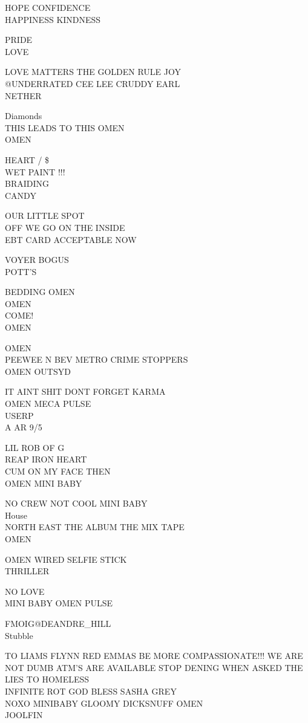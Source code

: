 \documentclass[10pt,letterpaper]{article}
\begin{document}
HOPE CONFIDENCE\\
HAPPINESS KINDNESS

PRIDE\\
LOVE

LOVE MATTERS THE GOLDEN RULE JOY\\
@UNDERRATED CEE LEE CRUDDY EARL\\
NETHER

Diamonds\\
THIS LEADS TO THIS OMEN\\
OMEN

HEART / \$\\
WET PAINT !!!\\
BRAIDING\\
CANDY

OUR LITTLE SPOT\\
OFF WE GO ON THE INSIDE\\
EBT CARD ACCEPTABLE NOW

VOYER BOGUS\\
POTT'S

BEDDING OMEN\\
OMEN\\
COME!\\
OMEN

OMEN\\
PEEWEE N BEV METRO CRIME STOPPERS\\
OMEN OUTSYD

IT AINT SHIT DONT FORGET KARMA\\
OMEN MECA PULSE\\
USERP\\
A AR 9/5

LIL ROB OF G\\
REAP IRON HEART\\
CUM ON MY FACE THEN\\
OMEN MINI BABY

NO CREW NOT COOL MINI BABY\\
House\\
NORTH EAST THE ALBUM THE MIX TAPE\\
OMEN

OMEN WIRED SELFIE STICK\\
THRILLER

NO LOVE\\
MINI BABY OMEN PULSE

FMOIG@DEANDRE\_HILL\\
Stubble

TO LIAMS FLYNN RED EMMAS BE MORE COMPASSIONATE!!! WE ARE NOT DUMB ATM'S ARE AVAILABLE STOP DENING WHEN ASKED THE LIES TO HOMELESS\\
INFINITE ROT GOD BLESS SASHA GREY\\
NOXO MINIBABY GLOOMY DICKSNUFF OMEN\\
JOOLFIN
\end{document}
